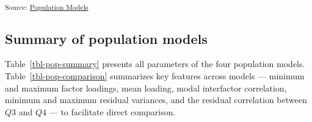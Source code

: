 \documentclass[
  letterpaper,
  DIV=11,
  numbers=noendperiod]{scrartcl}
\begin{document}
\textsubscript{Source:
\href{https://phdpablo.github.io/cfa-power/Scripts/AnalysisScripts/01_population_models-preview.html\#cell-fig-diagram-h1model}{Population
Models}}

\subsection{Summary of population
models}\label{summary-of-population-models}

Table~\ref{tbl-pop-summary} presents all parameters of the four
population models. Table~\ref{tbl-pop-comparison} summarizes key
features across models --- minimum and maximum factor loadings, mean
loading, modal interfactor correlation, minimum and maximum residual
variances, and the residual correlation between \(Q3\) and \(Q4\) --- to
facilitate direct comparison.
\end{document}
